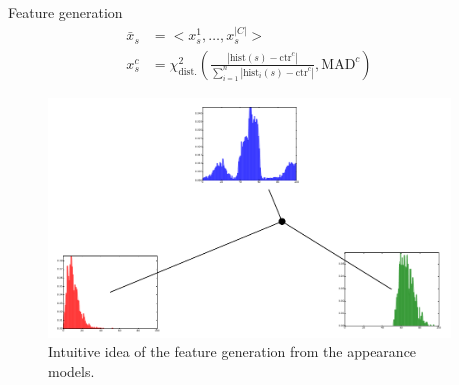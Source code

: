 \begin{frame}
\begin{columns}
\begin{column}{.49\textwidth}
\end{column}
\begin{column}{.52\textwidth}
\begin{block}{Feature generation}
\vspace{-10pt}
\begin{align*}
\bar{x}_s & = < x^1_s,\dotsc,x^{|C|}_s > \\
x_s^c & = \chi^2_{\text{dist.}} \left( 
\frac{|\text{hist}(s) - \text{ctr}^c |}{\sum\nolimits_{i=1}^n |\text{hist}_i(s) - \text{ctr}^c |},\text{MAD}^c
\right )
\end{align*}
\end{block}
\vspace{-10pt}
\begin{figure}[htbp]
\centering
\includegraphics[width=\textwidth]{madModelsDistance}
\caption{ Intuitive idea of the feature generation from the appearance models.}
\end{figure}
\end{column}
\end{columns}
\end{frame}

